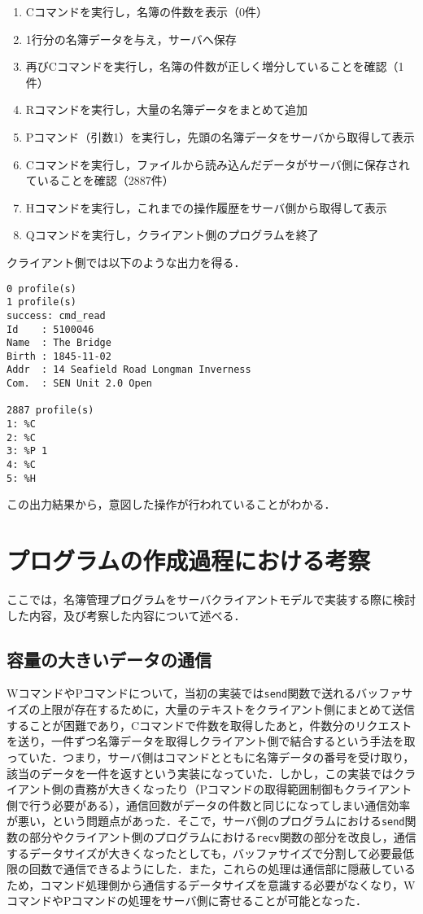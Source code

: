 \documentclass[11pt]{jsarticle}
\begin{document}
\begin{enumerate}
      \item Cコマンドを実行し，名簿の件数を表示（0件）
      \item 1行分の名簿データを与え，サーバへ保存
      \item 再びCコマンドを実行し，名簿の件数が正しく増分していることを確認（1件）
      \item Rコマンドを実行し，大量の名簿データをまとめて追加
      \item Pコマンド（引数1）を実行し，先頭の名簿データをサーバから取得して表示
      \item Cコマンドを実行し，ファイルから読み込んだデータがサーバ側に保存されていることを確認（2887件）
      \item Hコマンドを実行し，これまでの操作履歴をサーバ側から取得して表示
      \item Qコマンドを実行し，クライアント側のプログラムを終了
\end{enumerate}

クライアント側では以下のような出力を得る．

\begin{verbatim}
0 profile(s)
1 profile(s)
success: cmd_read
Id    : 5100046
Name  : The Bridge
Birth : 1845-11-02
Addr  : 14 Seafield Road Longman Inverness
Com.  : SEN Unit 2.0 Open

2887 profile(s)
1: %C
2: %C
3: %P 1
4: %C
5: %H
\end{verbatim}

この出力結果から，意図した操作が行われていることがわかる．

\section{プログラムの作成過程における考察}

ここでは，名簿管理プログラムをサーバクライアントモデルで実装する際に検討した内容，及び考察した内容について述べる．

\subsection{容量の大きいデータの通信}

WコマンドやPコマンドについて，当初の実装では{\tt send}関数で送れるバッファサイズの上限が存在するために，大量のテキストをクライアント側にまとめて送信することが困難であり，Cコマンドで件数を取得したあと，件数分のリクエストを送り，一件ずつ名簿データを取得しクライアント側で結合するという手法を取っていた．つまり，サーバ側はコマンドとともに名簿データの番号を受け取り，該当のデータを一件を返すという実装になっていた．しかし，この実装ではクライアント側の責務が大きくなったり（Pコマンドの取得範囲制御もクライアント側で行う必要がある），通信回数がデータの件数と同じになってしまい通信効率が悪い，という問題点があった．そこで，サーバ側のプログラムにおける{\tt send}関数の部分やクライアント側のプログラムにおける{\tt recv}関数の部分を改良し，通信するデータサイズが大きくなったとしても，バッファサイズで分割して必要最低限の回数で通信できるようにした．また，これらの処理は通信部に隠蔽しているため，コマンド処理側から通信するデータサイズを意識する必要がなくなり，WコマンドやPコマンドの処理をサーバ側に寄せることが可能となった．
\end{document}

